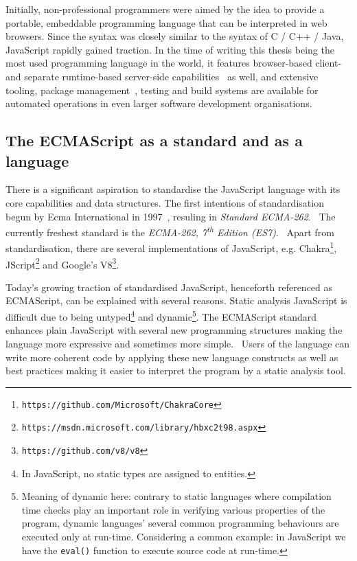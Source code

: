 Initially, non-professional programmers were aimed by the idea to provide a portable, embeddable programming language that can be interpreted in web browsers. Since the syntax was closely similar to the syntax of C / C++ / Java, JavaScript rapidly gained traction. In the time of writing this thesis being the most used programming language in the world, it features browser-based client- and separate runtime-based server-side capabilities~\cite{nodejs} as well, and extensive tooling, package management~\cite{npmjs}, testing and build systems are available for automated operations in even larger software development organisations.


\subsection{The ECMAScript as a standard and as a language}

There is a significant aspiration to standardise the JavaScript language with its core capabilities and data structures. The first intentions of standardisation begun by Ecma International in 1997~\cite{webedjavascripthistory}, resuling in \emph{Standard ECMA-262}.~\cite{ecmascriptstandardfirstversion} The currently freshest standard is the \emph{ECMA-262, 7\textsuperscript{th} Edition (ES7)}.~\cite{ecmascriptstandard} Apart from standardisation, there are several implementations of JavaScript, e.g. Chakra\footnote{\texttt{https://github.com/Microsoft/ChakraCore}}, JScript\footnote{\texttt{https://msdn.microsoft.com/library/hbxc2t98.aspx}} and Google's V8\footnote{\texttt{https://github.com/v8/v8}}.~\cite{stein-daniel-msc}

Today's growing traction of standardised JavaScript, henceforth referenced as ECMAScript, can be explained with several reasons. Static analysis JavaScript is difficult due to being untyped\footnote{In JavaScript, no static types are assigned to entities.} and dynamic\footnote{Meaning of dynamic here: contrary to static languages where compilation time checks play an important role in verifying various properties of the program, dynamic languages' several common programming behaviours are executed only at run-time. Considering a common example: in JavaScript we have the \texttt{eval()} function to execute source code at run-time.}. The ECMAScript standard enhances plain JavaScript with several new programming structures making the language more expressive and sometimes more simple.~\cite{es6-features} Users of the language can write more coherent code by applying these new language constructs as well as best practices making it easier to interpret the program by a static analysis tool.



